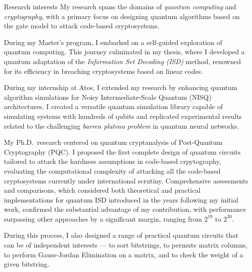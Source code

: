 \documentclass{resume} %
\begin{document}
\begin{rSection}{Research interests}
  My research spans the domains of \emph{quantum computing} and
  \emph{cryptography}, with a primary focus on designing quantum algorithms
  based on the gate model to attack code-based cryptosystems.

  During my Master's program, I embarked on a self-guided exploration of quantum
  computing. This journey culminated in my thesis, where I developed a quantum
  adaptation of the \emph{Information Set Decoding (ISD)} method, renowned for
  its efficiency in breaching cryptosystems based on linear codes.

  During my internship at Atos, I extended my research by enhancing quantum
  algorithm simulations for Noisy Intermediate-Scale Quantum (NISQ)
  architectures. I created a versatile quantum simulation library capable of
  simulating systems with hundreds of qubits and replicated experimental results
  related to the challenging \emph{barren plateau problem} in quantum neural
  networks.

  My Ph.D.\ research centered on quantum cryptanalysis of Post-Quantum
  Cryptography (PQC). I proposed the first complete design of quantum circuits
  tailored to attack the hardness assumptions in code-based crpytography,
  evaluating the computational complexity of attacking all the code-based
  cryptosystems currently under international scrutiny.
  Comprehensive assessments and comparisons, which considered both theoretical
  and practical implementations for quantum ISD introduced in the years
  following my initial work, confirmed the substantial advantage of my
  contribution, with performance surpassing other approaches by a significant
  margin, ranging from $2^{19}$ to $2^{30}$.

  During this process, I also designed a range of practical quantum circuits
  that can be of independent interests --- to sort bitstrings, to permute matrix
  columns, to perform Gauss-Jordan Elimination on a matrix, and to check the
  weight of a given bitstring.

\end{rSection}
\clearpage
\end{document}
